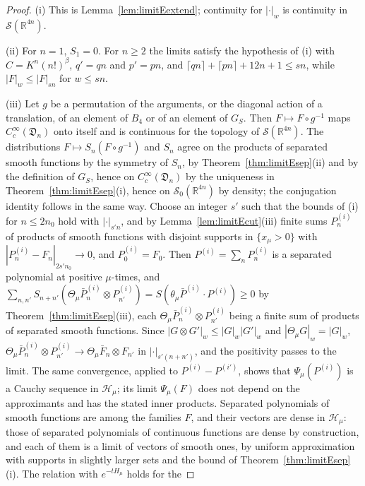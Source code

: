 \documentclass[aps,prd,twocolumn,superscriptaddress,nofootinbib,longbibliography,floatfix,amsmath,amssymb,10pt]{revtex4-2}
\theoremstyle{definition}
\theoremstyle{remark}
\newcommand{\R}{\mathbb{R}}
\begin{document}
\begin{proof}
(i) This is Lemma~\ref{lem:limitEextend}; continuity for $|\cdot|_w$ is
continuity in $\mathcal S(\R^{4n})$.

(ii) For $n=1$, $S_1=0$. For $n\ge2$ the limits satisfy the hypothesis of (i)
with $C=K^n(n!)^\beta$, $q'=qn$ and $p'=pn$, and $\lceil qn\rceil+\lceil pn
\rceil+12n+1\le sn$, while $|F|_w\le|F|_{sn}$ for $w\le sn$.

(iii) Let $g$ be a permutation of the arguments, or the diagonal action of a
translation, of an element of $B_4$ or of an element of $G_S$. Then $F\mapsto
F\circ g^{-1}$ maps $C^\infty_c(\mathfrak D_n)$ onto itself and is continuous
for the topology of $\mathcal S(\R^{4n})$. The distributions
$F\mapsto S_n(F\circ g^{-1})$ and $S_n$ agree on the products of separated
smooth functions by the symmetry of $S_n$, by
Theorem~\ref{thm:limitEsep}(ii) and by the definition of $G_S$, hence on
$C^\infty_c(\mathfrak D_n)$ by the uniqueness in
Theorem~\ref{thm:limitEsep}(i), hence on $\mathcal S_0(\R^{4n})$ by density;
the conjugation identity follows in the same way. Choose an integer $s'$ such
that the bounds of (i) for $n\le2n_0$ hold with $|\cdot|_{s'n}$, and by
Lemma~\ref{lem:limitEcut}(iii) finite sums $P^{(i)}_n$ of products of smooth
functions with disjoint supports in $\{x_\mu>0\}$ with $|P^{(i)}_n-F_n|_{2s'n_0}
\to0$, and $P^{(i)}_0=F_0$. Then $P^{(i)}=\sum_nP^{(i)}_n$ is a separated
polynomial at positive $\mu$-times, and $\sum_{n,n'}S_{n+n'}(\Theta_\mu\bar
P^{(i)}_n\otimes P^{(i)}_{n'})=S(\theta_\mu\bar P^{(i)}\cdot P^{(i)})\ge0$ by
Theorem~\ref{thm:limitEsep}(iii), each $\Theta_\mu\bar P^{(i)}_n\otimes
P^{(i)}_{n'}$ being a finite sum of products of separated smooth functions.
Since $|G\otimes G'|_w\le|G|_w|G'|_w$ and $|\Theta_\mu G|_w=|G|_w$,
$\Theta_\mu\bar P^{(i)}_n\otimes P^{(i)}_{n'}\to\Theta_\mu\bar F_n\otimes
F_{n'}$ in $|\cdot|_{s'(n+n')}$, and the positivity passes to the limit. The
same convergence, applied to $P^{(i)}-P^{(i')}$, shows that
$\Psi_\mu(P^{(i)})$ is a Cauchy sequence in $\mathcal H_\mu$; its limit
$\Psi_\mu(F)$ does not depend on the approximants and has the stated inner
products. Separated polynomials of smooth functions are among the families
$F$, and their vectors are dense in $\mathcal H_\mu$: those of separated
polynomials of continuous functions are dense by construction, and each of
them is a limit of vectors of smooth ones, by uniform approximation with
supports in slightly larger sets and the bound of
Theorem~\ref{thm:limitEsep}(i). The relation with $e^{-tH_\mu}$ holds for the

\end{proof}
\end{document}
